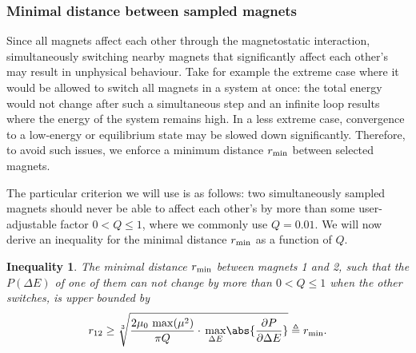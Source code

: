 \subsubsection{Minimal distance between sampled magnets}\label{sec:2:MultiSwitch:rmin} %
Since all magnets affect each other through the magnetostatic interaction, simultaneously switching nearby magnets that significantly affect each other's  may result in unphysical behaviour.
Take for example the extreme case where it would be allowed to switch all magnets in a system at once: the total energy would not change after such a simultaneous step and an infinite loop results where the energy of the system remains high.
In a less extreme case, convergence to a low-energy or equilibrium state may be slowed down significantly.
Therefore, to avoid such issues, we enforce a minimum distance $r_\mathrm{min}$ between selected magnets. \par
The particular criterion we will use is as follows: two simultaneously sampled magnets should never be able to affect each other's  by more than some user-adjustable factor $0 < Q \leq 1$, where we commonly use $Q=0.01$.
We will now derive an inequality for the minimal distance $r_\mathrm{min}$ as a function of $Q$.
\newtheorem{inequality}{Inequality}
\begin{inequality}
	The minimal distance $r_\mathrm{min}$ between magnets 1 and 2, such that the  $P(\Delta E)$ of one of them can not change by more than $0 < Q \leq 1$ when the other switches, is upper bounded by
	\begin{equation}
		r_{12} \geq \sqrt[3]{\frac{2 \mu_0 \, \max(\mu^2)}{\pi Q} \cdot \, \underset{\Delta E}{\max} \abs{\frac{\partial P}{\partial \Delta E}}} \triangleq \rmin \mathrm{.}
		\label{eq:2:MultiSwitch_inequality}
	\end{equation}
\end{inequality}



